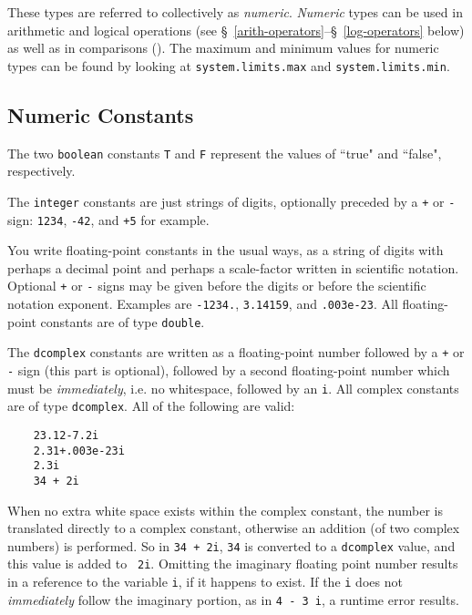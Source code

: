 These types are referred to collectively as {\em numeric}.  {\em Numeric}
types can be used in arithmetic and logical
operations (see \S~\ref{arith-operators}--\S~\ref{log-operators}
below) as well as in comparisons (). The maximum and
minimum values for numeric types can be found by looking at
\verb+system.limits.max+ and \verb+system.limits.min+.

\subsection{Numeric Constants}
\label{numeric-constants}

The two {\tt boolean} constants
{\tt T} and {\tt F}
represent the values of ``true" and ``false", respectively.

The {\tt integer} constants are just strings of digits, optionally preceded
by a {\tt +} or {\tt -} sign: {\tt 1234}, {\tt -42}, and {\tt +5} for example.

You write floating-point constants in the usual ways, as a string of digits
with perhaps a decimal point and perhaps a scale-factor written in scientific
notation.  Optional {\tt +} or {\tt -} signs may be given before the digits
or before the scientific notation exponent.
Examples are {\tt -1234.}, {\tt 3.14159}, and {\tt .003e-23}.
All floating-point constants are of type {\tt double}.

The {\tt dcomplex} constants are written as a floating-point
number followed by a {\tt +} or {\tt -} sign (this part is optional), followed by a second floating-point
number which must be {\em immediately}, i.e. no whitespace, followed by an {\tt i}.
All complex constants are of type {\tt dcomplex}.
All of the following are valid:
\begin{verbatim}
    23.12-7.2i
    2.31+.003e-23i
    2.3i
    34 + 2i
\end{verbatim}
When no extra white space exists within the complex constant, the number
is translated directly to a complex constant, otherwise an addition (of
two complex numbers) is performed. So in {\tt 34\ +\ 2i}, {\tt 34} is 
converted to a {\tt dcomplex} value, and this value is added to {\tt
2i}.  Omitting the imaginary floating
point number results in a reference to the variable {\tt i}, if it happens to exist.
If the {\tt i} does not {\em immediately} follow the imaginary
portion, as in {\tt 4\ -\ 3\ i}, a runtime error results.

